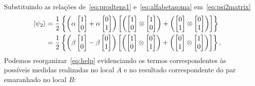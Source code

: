 Substituindo as relações de~\eqref{eq:prodtens1} e~\eqref{eq:alfabetasoma} em~\eqref{eq:psi2matrix}
\begin{equation}\label{eq:help}
  \begin{split}
\ket{\psi_2} &= \frac{1}{2}\left\{\left(\alpha\begin{bmatrix}
1 \\
0
\end{bmatrix}+\alpha\begin{bmatrix}
0 \\
1
\end{bmatrix}\right)\left[\left(\begin{bmatrix}
1 \\
0
\end{bmatrix} \otimes \begin{bmatrix}
1 \\
0
\end{bmatrix}\right) + \left(\begin{bmatrix}
0 \\
1
\end{bmatrix} \otimes \begin{bmatrix}
0 \\
1
\end{bmatrix}\right)\right]\right\} \nonumber \\
&= \frac{1}{2}\left\{\left(\beta\begin{bmatrix}
1 \\
0
\end{bmatrix}-\beta\begin{bmatrix}
0 \\
1
\end{bmatrix}\right)\left[\left(\begin{bmatrix}
1 \\
0
\end{bmatrix} \otimes \begin{bmatrix}
0 \\
1
\end{bmatrix}\right) + \left(\begin{bmatrix}
0 \\
1
\end{bmatrix} \otimes \begin{bmatrix}
1 \\
0
\end{bmatrix}\right)\right]\right\}.
  \end{split}
\end{equation}
Podemos reorganizar~\eqref{eq:help} evidenciando os termos correspondentes às possíveis medidas realizadas no local \(A\) e no resultado correspondente do par emaranhado no local \(B\):
